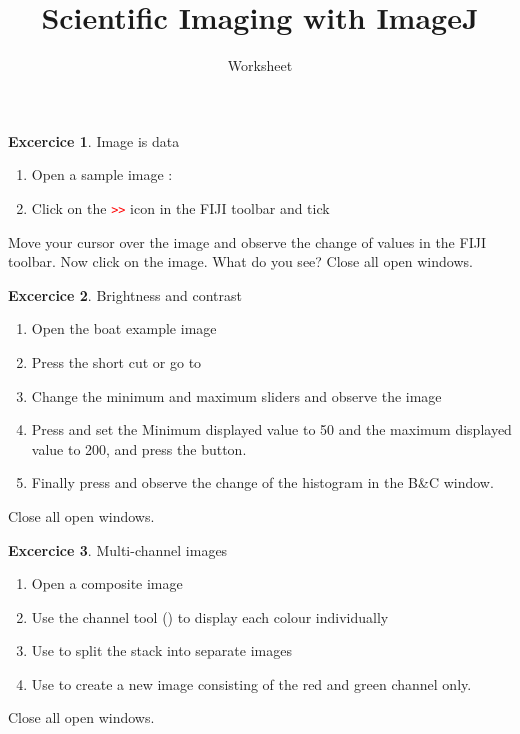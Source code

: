 \documentclass[xcolor=table,DIV=19,twocolumn]{scrartcl}
\title{Scientific Imaging with ImageJ}
\subtitle{Worksheet}
\theoremstyle{definition}
\newtheorem{exercice}{Excercice}
\begin{document}
\maketitle

\begin{exercice} Image is data
  \begin{enumerate}
  \item Open a sample image : 
  \item Click on the \textcolor{red}{\texttt{>>}} icon in the FIJI toolbar and tick
  \end{enumerate}
  Move your cursor over the image and observe the change of values in the FIJI toolbar. Now click on the image. What do you see?
  Close all open windows.
\end{exercice}

\begin{exercice} Brightness and contrast
  \begin{enumerate}
  \item Open the boat example image 
  \item Press the short cut  or go to 
  \item Change the minimum and maximum sliders and observe the image
  \item Press  and set the Minimum displayed value to 50
    and the maximum displayed value to 200, and press the  button.
  \item Finally press  and observe the change of the
    histogram in the B\&C window.
  \end{enumerate}
  Close all open windows. 
\end{exercice}

\begin{exercice} Multi-channel images
  \begin{enumerate}
  \item Open a composite image 
  \item Use the channel tool () to display each colour individually
  \item Use  to split the stack into separate images
  \item Use  to create a new image consisting of the red and green channel only. 
  \end{enumerate}
Close all open windows. 

\end{exercice}
\end{document}
